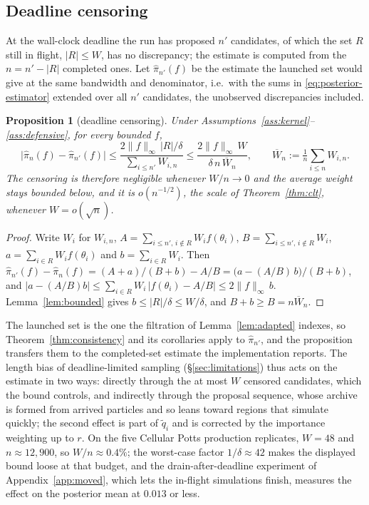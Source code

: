 \documentclass[10pt]{article}
\theoremstyle{plain}
\newtheorem{proposition}[theorem]{Proposition}
\theoremstyle{definition}
\begin{document}
\subsection{Deadline censoring}\label{app:theory-censoring}
At the wall-clock deadline the run has proposed $n'$ candidates, of which the set $R$ still in flight, $|R|\le W$, has no discrepancy; the estimate is computed from the $n=n'-|R|$ completed ones. Let $\widehat\pi_{n'}(f)$ be the estimate the launched set would give at the same bandwidth and denominator, i.e.\ with the sums in \eqref{eq:posterior-estimator} extended over all $n'$ candidates, the unobserved discrepancies included.
\begin{proposition}[deadline censoring]\label{prop:censoring}
Under Assumptions~\ref{ass:kernel}--\ref{ass:defensive}, for every bounded $f$,
\[
\bigl|\widehat\pi_n(f)-\widehat\pi_{n'}(f)\bigr|
\le\frac{2\|f\|_\infty\,|R|/\delta}{\sum_{i\le n'}W_{i,n}}
\le\frac{2\|f\|_\infty\,W}{\delta\,n\,\overline W_n},
\qquad \overline W_n:=\tfrac1n\textstyle\sum_{i\le n}W_{i,n} .
\]
The censoring is therefore negligible whenever $W/n\to0$ and the average weight stays bounded below, and it is $o(n^{-1/2})$, the scale of Theorem~\ref{thm:clt}, whenever $W=o(\sqrt n)$.
\end{proposition}
\begin{proof}
Write $W_i$ for $W_{i,n}$, $A=\sum_{i\le n',\,i\notin R}W_if(\theta_i)$, $B=\sum_{i\le n',\,i\notin R}W_i$, $a=\sum_{i\in R}W_if(\theta_i)$ and $b=\sum_{i\in R}W_i$. Then $\widehat\pi_{n'}(f)-\widehat\pi_n(f)=(A+a)/(B+b)-A/B=\bigl(a-(A/B)\,b\bigr)/(B+b)$, and $|a-(A/B)b|\le\sum_{i\in R}W_i\,|f(\theta_i)-A/B|\le2\|f\|_\infty\,b$. Lemma~\ref{lem:bounded} gives $b\le|R|/\delta\le W/\delta$, and $B+b\ge B=n\overline W_n$.
\end{proof}
The launched set is the one the filtration of Lemma~\ref{lem:adapted} indexes, so Theorem~\ref{thm:consistency} and its corollaries apply to $\widehat\pi_{n'}$, and the proposition transfers them to the completed-set estimate the implementation reports. The length bias of deadline-limited sampling (\S\ref{sec:limitations}) thus acts on the estimate in two ways: directly through the at most $W$ censored candidates, which the bound controls, and indirectly through the proposal sequence, whose archive is formed from arrived particles and so leans toward regions that simulate quickly; the second effect is part of $\tilde q_i$ and is corrected by the importance weighting up to $r$. On the five Cellular Potts production replicates, $W=48$ and $n\approx12{,}900$, so $W/n\approx0.4\%$; the worst-case factor $1/\delta\approx42$ makes the displayed bound loose at that budget, and the drain-after-deadline experiment of Appendix~\ref{app:moved}, which lets the in-flight simulations finish, measures the effect on the posterior mean at $0.013$ or less.
\end{document}
